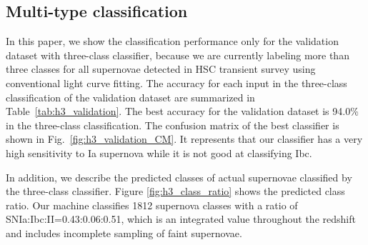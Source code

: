 \documentclass[useamsfonts]{pasj01}
\begin{document}
\subsection{Multi-type classification}
\label{sec:h3}
%
In this paper, we show the classification performance only for the validation dataset with three-class classifier, because we are currently labeling more than three classes for all supernovae detected in HSC transient survey using conventional light curve fitting.
%
The accuracy for each input in the three-class classification of the validation dataset are summarized in Table\ \ref{tab:h3_validation}.
The best accuracy for the validation dataset is 94.0\% in the three-class classification.
The confusion matrix of the best classifier is shown in Fig.\ \ref{fig:h3_validation_CM}.
It represents that our classifier has a very high sensitivity to Ia supernova while it is not good at classifying Ibc.

In addition, we describe the predicted classes of actual supernovae classified by the three-class classifier.
Figure \ref{fig:h3_class_ratio} shows the predicted class ratio.
Our machine classifies 1812 supernova classes with a ratio of SNIa:Ibc:II=0.43:0.06:0.51, which is an integrated value throughout the redshift and includes incomplete sampling of faint supernovae.
\end{document}
